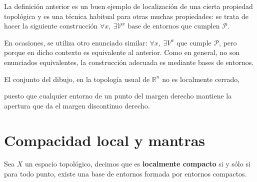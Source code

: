 \begin{obs}
La definición anterior es un buen ejemplo de localización de una cierta propiedad topológica y es una técnica habitual para otras muchas propiedades: se trata de hacer la siguiente construcción $\forall x,\ \exists \mathcal{V}^x \text{ base de entornos que cumplen } \mathcal{P}$.

En ocasiones, se utiliza otro enunciado similar: $\forall x,\ \exists V^x \text{ que cumple } \mathcal{P}$, pero porque en dicho contexto es equivalente al anterior. Como en general, no son enunciados equivalentes, la construcción adecuada es mediante bases de entornos.
\end{obs}

\begin{ej}
El conjunto del dibujo, en la topología usual de $\mathbb{R}^n$ no es localmente cerrado,

puesto que cualquier entorno de un punto del margen derecho mantiene la apertura que da el margen discontinuo derecho.
\end{ej}

\section{Compacidad local y mantras}%
\label{sec:compacidad_local_y_mantras}
\begin{defi}
Sea $X$ un espacio topológico, decimos que es \textbf{localmente compacto} si y sólo si para todo punto, existe una base de entornos formada por entornos compactos.
\end{defi}

